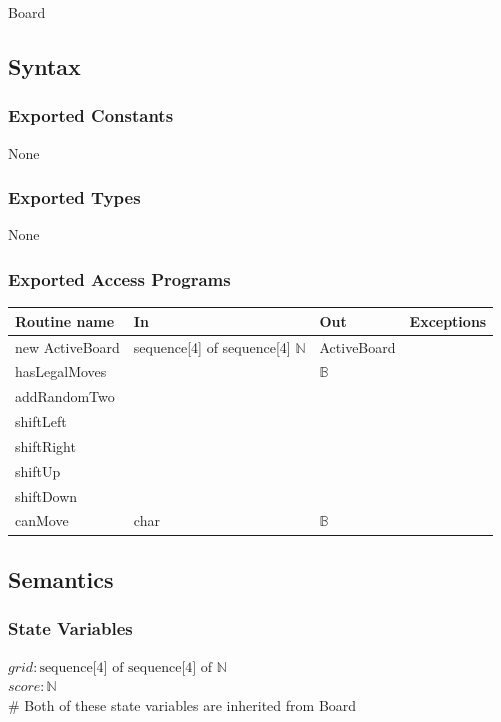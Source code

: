 \documentclass[12pt]{article}
\begin{document}
Board

\subsection* {Syntax}

\subsubsection* {Exported Constants}

None

\subsubsection* {Exported Types}

None

\subsubsection* {Exported Access Programs}

\begin{tabular}{| l | l | l | p{5cm} |}
\hline
\textbf{Routine name} & \textbf{In} & \textbf{Out} & \textbf{Exceptions}\\
\hline
new ActiveBoard & sequence[4] of sequence[4] $\mathbb{N}$ & ActiveBoard &~\\
\hline
hasLegalMoves & & $\mathbb{B}$ &~\\
\hline
addRandomTwo & & &~\\
\hline
shiftLeft & & &~\\
\hline
shiftRight & & &~\\
\hline
shiftUp & & &~\\
\hline
shiftDown & & &~\\
\hline
canMove & char & $\mathbb{B}$ &~\\
\hline
\end{tabular}

\subsection*{Semantics}

\subsubsection*{State Variables}

$\mathit{grid}: \text{sequence[4] of sequence[4] of } \mathbb{N}$\\
$\mathit{score}: \mathbb{N}$ \\
\# Both of these state variables are inherited from Board
\end{document}
